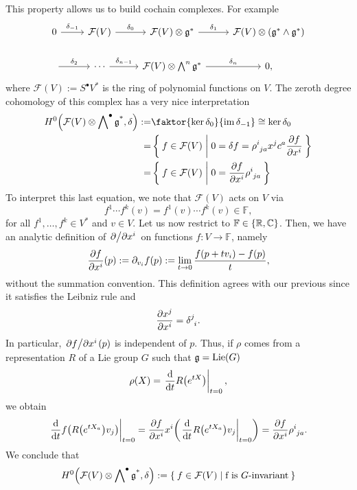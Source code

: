 This property allows us to build cochain complexes. For example
\begin{equation}
\begin{tikzcd}
0\arrow[r,"\delta_{-1}"]&\mathcal{F}(V)\arrow[r,"\delta_0"]&\mathcal{F}(V)\otimes\g^*\arrow[r,"\delta_1"]&\mathcal{F}(V)\otimes(\g^*\wedge\g^*)\\
\arrow[r,"\delta_2"]&\cdots\arrow[r,"\delta_{n-1}"]&\mathcal{F}(V)\otimes\bigwedge\nolimits^{n}\g^*\arrow[r,"\delta_n"]& 0,
\end{tikzcd}
\end{equation}
where $\mathcal{F}(V):=S^\bullet V^*$ is the ring of polynomial functions on $V$. The zeroth degree cohomology of this complex has a very nice interpretation
\begin{equation}
\begin{aligned}
H^0\qty(\mathcal{F}(V)\otimes\altg,\delta):=& \faktor{\ker\delta_0}{\im\delta_{-1}}\cong\ker\delta_0\\
=&\Set{f\in\mathcal{F}(V)|0=\delta f=\rho\indices{^i_{ja}}x^jc^a\pdv{f}{x^i}}\\
=&\Set{f\in\mathcal{F}(V)|0=\pdv{f}{x^i}\rho\indices{^i_{ja}}}
\end{aligned}
\end{equation}
To interpret this last equation, we note that $\mathcal{F}(V)$ acts on $V$ via 
\begin{equation}
f^1\cdots f^k(v)=f^1(v)\cdots f^k(v)\in\mathbb{F},
\end{equation}
for all $f^1,\dots,f^k\in V^*$ and $v\in V$. Let us now restrict to $\mathbb{F}\in\qty{\mathbb{R},\mathbb{C}}$. Then, we have an analytic definition of $\pdv*{x^i}$ on functions $f:V\rightarrow\mathbb{F}$, namely
\begin{equation}
{\pdv{f}{x^i}}(p):=\partial_{v_i}f(p):=\lim_{t\rightarrow 0}\frac{f(p+tv_i)-f(p)}{t},
\end{equation}
without the summation convention. This definition agrees with our previous since it satisfies the Leibniz rule and 
\begin{equation}
\pdv{x^j}{x^i}=\delta\indices{^j_i}.
\end{equation}
In particular, ${\pdv*{f}{x^i}}(p)$ is independent of $p$. Thus, if $\rho$ comes from a representation $R$ of a Lie group $G$ such that $\mathfrak{g}=\text{Lie}(G)$
\begin{equation}
\rho(X)=\left.\dv{t}R\qty(e^{tX})\right|_{t=0},
\end{equation} 
we obtain
\begin{equation}
\left.\dv{t}f\qty(R\qty(e^{tX_a})v_j)\right|_{t=0}=\pdv{f}{x^i}x^i\qty(\left.\dv{t}R\qty(e^{tX_a})v_j\right|_{t=0})=\pdv{f}{x^i}\rho\indices{^i_{ja}}.
\end{equation}
We conclude that
\begin{equation}
H^0\qty(\mathcal{F}(V)\otimes\operatorname{\bigwedge\nolimits^\bullet\mathfrak{g}^*},\delta):=\Set{f\in\mathcal{F}(V)|\text{f is $G$-invariant}}
\end{equation}

